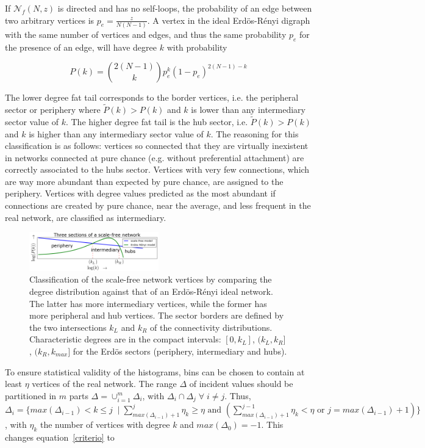 \documentclass[%
	aip,
	jmp,%
	amsmath,amssymb,
	reprint,%
]{revtex4-1}
\begin{document}
If $\mathcal{N}_f(N,z)$ is directed and has no self-loops, the probability
of an edge between two arbitrary vertices is $p_e=\frac{z}{N(N-1)}$.
A vertex in the ideal Erd\"os-R\'enyi digraph with the same number of vertices and edges, and thus the same probability $p_e$ for the presence of an edge, will have degree $k$ with probability

\begin{equation}
	P(k)=\binom{2(N-1)}{k}p_e^k(1-p_e)^{2(N-1)-k}
\end{equation}

The lower degree fat tail corresponds to the border vertices, i.e. the peripheral sector or periphery where $\widetilde{P}(k)>P(k)$ and $k$ is lower than any intermediary sector value of $k$. The higher degree fat tail is the hub sector, i.e. $\widetilde{P}(k)>P(k)$ and $k$ is higher than any intermediary sector value of $k$. The reasoning for this classification is as follows: vertices so connected that they are virtually inexistent in networks connected at pure chance (e.g. without preferential attachment) are correctly associated to the hubs sector. Vertices with very few connections, which are way more abundant than expected by pure chance, are assigned to the periphery. Vertices with degree values predicted as the most abundant if connections are created by pure chance, near the average, and less frequent in the real network, are classified as intermediary.

\begin{figure}[!h]
	\centering
	\includegraphics[width=0.5\textwidth]{figs/fser_}
	\caption{Classification of the scale-free network vertices by comparing the degree
		distribution against that of an Erd\"os-R\'enyi ideal network.
		The latter has more intermediary vertices, while the former has more peripheral and hub vertices.
		The sector borders are defined by the two intersections $k_L$ and $k_R$ of the connectivity distributions.
		Characteristic degrees are in the compact intervals: $[0,k_L]$, $(k_L,k_R]$, $(k_R,k_{max}]$ for the Erd\"os sectors (periphery, intermediary and hubs).}
		\label{fig:setores}
\end{figure}
To ensure statistical validity of the histograms, bins can be chosen to contain at least $\eta$ vertices of the real network. The range $\Delta$ of incident values should be partitioned in $m$ parts $\Delta=\cup_{i=1}^m \Delta_i$, with $\Delta_i\cap \Delta_j \; \forall\; i \neq j$. Thus, $\Delta_i=\{max(\Delta_{i-1})<k\leq j \;\;|\; \sum_{max(\Delta_{i-1})+1}^j \eta_k \geq \eta \text{ and } (\sum_{max(\Delta_{i-1})+1}^{j-1} \eta_k < \eta \text{ or } j=max(\Delta_{i-1})+1) \}$, with $\eta_k$ the number of vertices with degree $k$ and $max(\Delta_{0})=-1$. This changes equation~\ref{criterio} to
\end{document}
